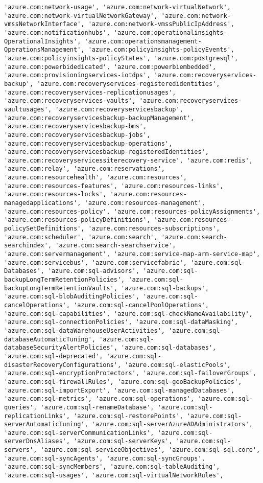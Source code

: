 \documentclass[11pt]{article}
\begin{document}
\begin{Verbatim}[commandchars=\\\{\}]
'azure.com:network-usage', 'azure.com:network-virtualNetwork', 'azure.com:network-virtualNetworkGateway', 'azure.com:network-vmssNetworkInterface', 'azure.com:network-vmssPublicIpAddress', 'azure.com:notificationhubs', 'azure.com:operationalinsights-OperationalInsights', 'azure.com:operationsmanagement-OperationsManagement', 'azure.com:policyinsights-policyEvents', 'azure.com:policyinsights-policyStates', 'azure.com:postgresql', 'azure.com:powerbidedicated', 'azure.com:powerbiembedded', 'azure.com:provisioningservices-iotdps', 'azure.com:recoveryservices-backup', 'azure.com:recoveryservices-registeredidentities', 'azure.com:recoveryservices-replicationusages', 'azure.com:recoveryservices-vaults', 'azure.com:recoveryservices-vaultusages', 'azure.com:recoveryservicesbackup', 'azure.com:recoveryservicesbackup-backupManagement', 'azure.com:recoveryservicesbackup-bms', 'azure.com:recoveryservicesbackup-jobs', 'azure.com:recoveryservicesbackup-operations', 'azure.com:recoveryservicesbackup-registeredIdentities', 'azure.com:recoveryservicessiterecovery-service', 'azure.com:redis', 'azure.com:relay', 'azure.com:reservations', 'azure.com:resourcehealth', 'azure.com:resources', 'azure.com:resources-features', 'azure.com:resources-links', 'azure.com:resources-locks', 'azure.com:resources-managedapplications', 'azure.com:resources-management', 'azure.com:resources-policy', 'azure.com:resources-policyAssignments', 'azure.com:resources-policyDefinitions', 'azure.com:resources-policySetDefinitions', 'azure.com:resources-subscriptions', 'azure.com:scheduler', 'azure.com:search', 'azure.com:search-searchindex', 'azure.com:search-searchservice', 'azure.com:servermanagement', 'azure.com:service-map-arm-service-map', 'azure.com:servicebus', 'azure.com:servicefabric', 'azure.com:sql-Databases', 'azure.com:sql-advisors', 'azure.com:sql-backupLongTermRetentionPolicies', 'azure.com:sql-backupLongTermRetentionVaults', 'azure.com:sql-backups', 'azure.com:sql-blobAuditingPolicies', 'azure.com:sql-cancelOperations', 'azure.com:sql-cancelPoolOperations', 'azure.com:sql-capabilities', 'azure.com:sql-checkNameAvailability', 'azure.com:sql-connectionPolicies', 'azure.com:sql-dataMasking', 'azure.com:sql-dataWarehouseUserActivities', 'azure.com:sql-databaseAutomaticTuning', 'azure.com:sql-databaseSecurityAlertPolicies', 'azure.com:sql-databases', 'azure.com:sql-deprecated', 'azure.com:sql-disasterRecoveryConfigurations', 'azure.com:sql-elasticPools', 'azure.com:sql-encryptionProtectors', 'azure.com:sql-failoverGroups', 'azure.com:sql-firewallRules', 'azure.com:sql-geoBackupPolicies', 'azure.com:sql-importExport', 'azure.com:sql-managedDatabases', 'azure.com:sql-metrics', 'azure.com:sql-operations', 'azure.com:sql-queries', 'azure.com:sql-renameDatabase', 'azure.com:sql-replicationLinks', 'azure.com:sql-restorePoints', 'azure.com:sql-serverAutomaticTuning', 'azure.com:sql-serverAzureADAdministrators', 'azure.com:sql-serverCommunicationLinks', 'azure.com:sql-serverDnsAliases', 'azure.com:sql-serverKeys', 'azure.com:sql-servers', 'azure.com:sql-serviceObjectives', 'azure.com:sql-sql.core', 'azure.com:sql-syncAgents', 'azure.com:sql-syncGroups', 'azure.com:sql-syncMembers', 'azure.com:sql-tableAuditing', 'azure.com:sql-usages', 'azure.com:sql-virtualNetworkRules', 
\end{Verbatim}
\end{document}
